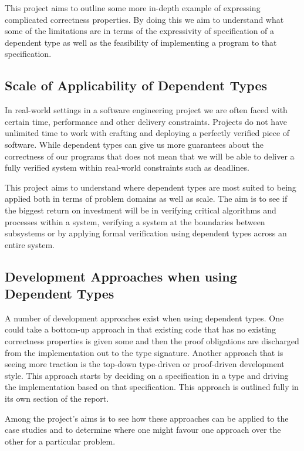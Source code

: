 \documentclass[a4paper, notitlepage]{report}
\begin{document}
This project aims to outline some more in-depth example of expressing
complicated correctness properties. By doing this we aim to understand what some
of the limitations are in terms of the expressivity of specification of a
dependent type as well as the feasibility of implementing a program to that
specification.

\subsection{Scale of Applicability of Dependent Types}
\label{sec:orgbe5391e}
In real-world settings in a software engineering project we are often faced with
certain time, performance and other delivery constraints. Projects do not have
unlimited time to work with crafting and deploying a perfectly verified piece of
software. While dependent types can give us more guarantees about the
correctness of our programs that does not mean that we will be able to deliver a
fully verified system within real-world constraints such as deadlines.

This project aims to understand where dependent types are most suited to being
applied both in terms of problem domains as well as scale. The aim is to see if
the biggest return on investment will be in verifying critical algorithms and
processes within a system, verifying a system at the boundaries between
subsystems or by applying formal verification using dependent types across an
entire system.

\subsection{Development Approaches when using Dependent Types}
\label{sec:orgea287e9}
A number of development approaches exist when using dependent types. One could
take a bottom-up approach in that existing code that has no existing correctness
properties is given some and then the proof obligations are discharged from the
implementation out to the type signature. Another approach that is seeing more
traction is the top-down type-driven or proof-driven development style. This
approach starts by deciding on a specification in a type and driving the
implementation based on that specification. This approach is outlined fully in
its own section of the report.

Among the project's aims is to see how these approaches can be applied to the
case studies and to determine where one might favour one approach over the other
for a particular problem.
\end{document}
